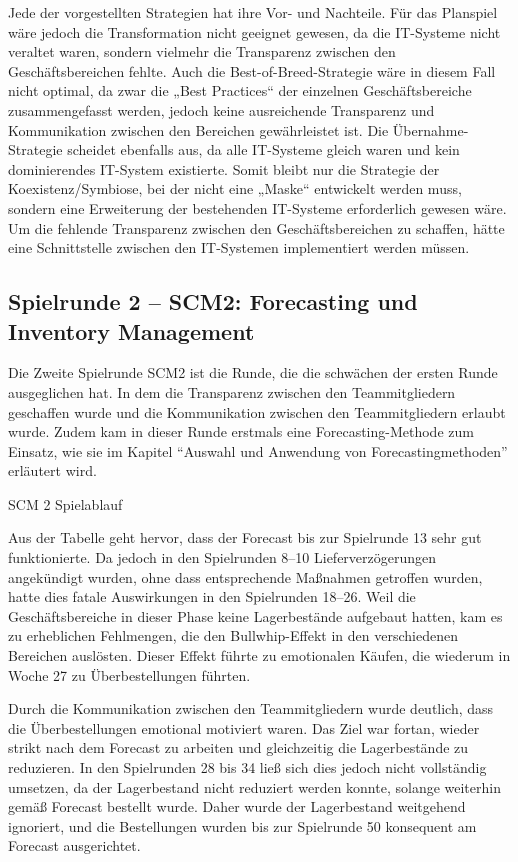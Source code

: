\documentclass[a4paper,12pt]{article}
\begin{document}
Jede der vorgestellten Strategien hat ihre Vor- und Nachteile. Für das Planspiel wäre jedoch die Transformation nicht geeignet gewesen,
da die IT-Systeme nicht veraltet waren, sondern vielmehr die Transparenz zwischen den Geschäftsbereichen fehlte.
Auch die Best-of-Breed-Strategie wäre in diesem Fall nicht optimal, da zwar die „Best Practices“ der einzelnen Geschäftsbereiche zusammengefasst werden,
jedoch keine ausreichende Transparenz und Kommunikation zwischen den Bereichen gewährleistet ist.
Die Übernahme-Strategie scheidet ebenfalls aus, da alle IT-Systeme gleich waren und kein dominierendes IT-System existierte.
Somit bleibt nur die Strategie der Koexistenz/Symbiose, bei der nicht eine „Maske“ entwickelt werden muss,
sondern eine Erweiterung der bestehenden IT-Systeme erforderlich gewesen wäre. Um die fehlende Transparenz zwischen den Geschäftsbereichen zu schaffen,
hätte eine Schnittstelle zwischen den IT-Systemen implementiert werden müssen.



\subsection{Spielrunde 2 – SCM2: Forecasting und Inventory Management}
Die Zweite Spielrunde SCM2 ist die Runde, die die schwächen der ersten Runde ausgeglichen hat.
In dem die Transparenz zwischen den Teammitgliedern geschaffen wurde und die Kommunikation zwischen den Teammitgliedern erlaubt wurde.
Zudem kam in dieser Runde erstmals eine Forecasting-Methode zum Einsatz, wie sie im Kapitel \enquote{Auswahl und Anwendung von Forecastingmethoden} erläutert wird.
\begin{table}[H]
    \centering
    \caption{SCM 2 Spielablauf}
    \label{tab:SCM 2 Spielablauf}
\end{table}
Aus der Tabelle geht hervor, dass der Forecast bis zur Spielrunde 13 sehr gut funktionierte.
Da jedoch in den Spielrunden 8–10 Lieferverzögerungen angekündigt wurden, ohne dass entsprechende Maßnahmen getroffen wurden, hatte dies fatale Auswirkungen in den Spielrunden 18–26.
Weil die Geschäftsbereiche in dieser Phase keine Lagerbestände aufgebaut hatten, kam es zu erheblichen Fehlmengen, die den Bullwhip-Effekt in den verschiedenen Bereichen auslösten.
Dieser Effekt führte zu emotionalen Käufen, die wiederum in Woche 27 zu Überbestellungen führten.

Durch die Kommunikation zwischen den Teammitgliedern wurde deutlich, dass die Überbestellungen emotional motiviert waren.
Das Ziel war fortan, wieder strikt nach dem Forecast zu arbeiten und gleichzeitig die Lagerbestände zu reduzieren.
In den Spielrunden 28 bis 34 ließ sich dies jedoch nicht vollständig umsetzen, da der Lagerbestand nicht reduziert werden konnte, solange weiterhin gemäß Forecast bestellt wurde.
Daher wurde der Lagerbestand weitgehend ignoriert, und die Bestellungen wurden bis zur Spielrunde 50 konsequent am Forecast ausgerichtet.
\end{document}
